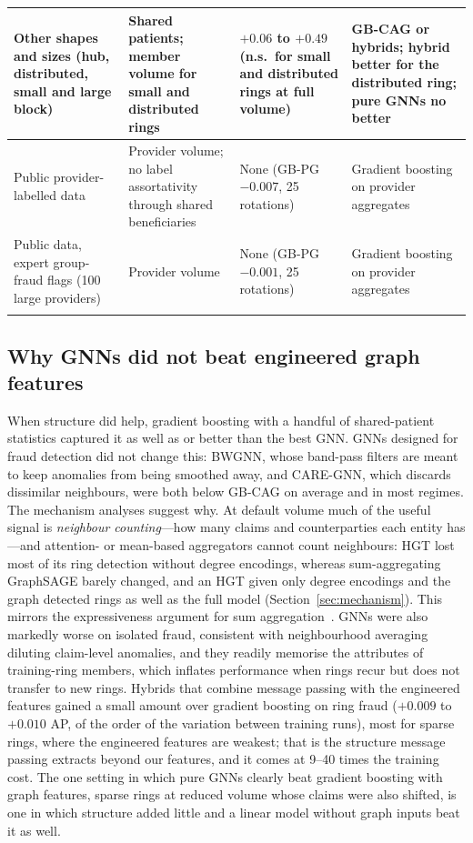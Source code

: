 \documentclass[pdflatex,sn-vancouver-num]{sn-jnl}
\begin{document}
\begin{table}[h]
\begin{tabular}{@{}>{\raggedright\arraybackslash}p{3.4cm}>{\raggedright\arraybackslash}p{2.6cm}>{\raggedright\arraybackslash}p{2.6cm}>{\raggedright\arraybackslash}p{3.4cm}@{}}
\addlinespace[2pt]
Other shapes and sizes (hub, distributed, small and large block) & Shared patients; member volume for small and distributed rings & $+0.06$ to $+0.49$ (n.s.\ for small and distributed rings at full volume) & GB-CAG or hybrids; hybrid better for the distributed ring; pure GNNs no better \\
\midrule
Public provider-labelled data & Provider volume; no label assortativity through shared beneficiaries & None (GB-PG $-0.007$, 25 rotations) & Gradient boosting on provider aggregates \\
\addlinespace[2pt]
Public data, expert group-fraud flags (100 large providers) & Provider volume & None (GB-PG $-0.001$, 25 rotations) & Gradient boosting on provider aggregates \\
\botrule
\end{tabular}
\end{table}

\subsection{Why GNNs did not beat engineered graph features}
When structure did help, gradient boosting with a handful of shared-patient
statistics captured it as well as or better than the best GNN. GNNs designed
for fraud detection did not change this: BWGNN, whose band-pass filters are
meant to keep anomalies from being smoothed away, and CARE-GNN, which
discards dissimilar neighbours, were both below GB-CAG on average and in
most regimes. The mechanism analyses suggest why. At default volume much of the
useful signal is \emph{neighbour counting}---how many claims and counterparties
each entity has---and attention- or mean-based aggregators cannot count
neighbours: HGT lost
most of its ring detection without degree encodings, whereas sum-aggregating
GraphSAGE barely changed, and an HGT given only degree encodings and the
graph detected rings as well as the full model (Section~\ref{sec:mechanism}). This mirrors the
expressiveness argument for sum aggregation~\cite{xu2019gin}. GNNs were
also markedly worse on isolated fraud, consistent with neighbourhood averaging
diluting claim-level anomalies, and they readily memorise the
attributes of training-ring members, which inflates performance when rings
recur but does not transfer to new rings. Hybrids that combine message
passing with the engineered features gained a small amount over gradient
boosting on ring fraud ($+0.009$ to $+0.010$ AP, of the order of the
variation between training runs), most for sparse rings, where the engineered
features are weakest; that is the structure message passing extracts beyond
our features, and it comes at 9--40 times the training cost. The one setting
in which pure GNNs clearly beat gradient boosting with graph features, sparse
rings at reduced volume whose claims were also shifted, is one in which
structure added little and a linear model without graph inputs beat it as
well.
\end{document}
